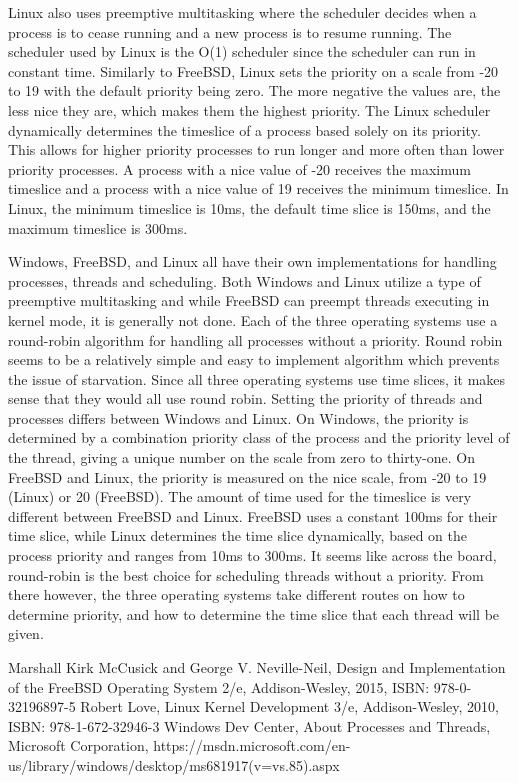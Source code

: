 \documentclass[letterpaper,10pt,draftclsnofoot,onecolumn,titlepage]{IEEEtran}
\begin{document}
		\par
		Linux also uses preemptive multitasking where the scheduler decides when a process is to cease running and a new process is to resume running. The scheduler used by Linux is the O(1) scheduler since the scheduler can run in constant time. Similarly to FreeBSD, Linux sets the priority on a scale from -20 to 19 with the default priority being zero. The more negative the values are, the less nice they are, which makes them the highest priority. The Linux scheduler dynamically determines the timeslice of a process based solely on its priority. This allows for higher priority processes to run longer and more often than lower priority processes. A process with a nice value of -20 receives the maximum timeslice and a process with a nice value of 19 receives the minimum timeslice. In Linux, the minimum timeslice is 10ms, the default time slice is 150ms, and the maximum timeslice is 300ms.
		\par
		Windows, FreeBSD, and Linux all have their own implementations for handling processes, threads and scheduling. Both Windows and Linux utilize a type of preemptive multitasking and while FreeBSD can preempt threads executing in kernel mode, it is generally not done. Each of the three operating systems use a round-robin algorithm for handling all processes without a priority. Round robin seems to be a relatively simple and easy to implement algorithm which prevents the issue of starvation. Since all three operating systems use time slices, it makes sense that they would all use round robin. Setting the priority of threads and processes differs between Windows and Linux. On Windows, the priority is determined by a combination priority class of the process and the priority level of the thread, giving a unique number on the scale from zero to thirty-one. On FreeBSD and Linux, the priority is measured on the nice scale, from -20 to 19 (Linux) or 20 (FreeBSD). The amount of time used for the timeslice is very different between FreeBSD and Linux. FreeBSD uses a constant 100ms for their time slice, while Linux determines the time slice dynamically, based on the process priority and ranges from 10ms to 300ms. It seems like across the board, round-robin is the best choice for scheduling threads without a priority. From there however, the three operating systems take different routes on how to determine priority, and how to determine the time slice that each thread will be given. 

	\begin{thebibliography}{3}
			Marshall Kirk McCusick and George V. Neville-Neil,
			Design and Implementation of the FreeBSD Operating System 2/e,
			Addison-Wesley,
			2015,
			ISBN: 978-0-32196897-5
			Robert Love,
			Linux Kernel Development 3/e,
			Addison-Wesley,
			2010,
			ISBN: 978-1-672-32946-3
			Windows Dev Center,
			About Processes and Threads,
			Microsoft Corporation,
			https://msdn.microsoft.com/en-us/library/windows/desktop/ms681917(v=vs.85).aspx
	\end{thebibliography}
\end{document}
